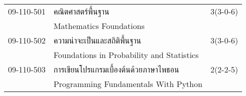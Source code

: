 \begin{longtable}{p{}p{}r{}}
09-110-501 & คณิตศาสตร์พื้นฐาน & 3(3-0-6)\\
 & Mathematics Foundations & \\[3mm]
09-110-502 & ความน่าจะเป็นและสถิติพื้นฐาน & 3(3-0-6)\\
 & Foundations in Probability and Statistics & \\[3mm]
09-110-503 & การเขียนโปรแกรมเบื้องต้นด้วยภาษาไพธอน & 2(2-2-5)\\
 & Programming Fundamentals With Python & \\[3mm]
\end{longtable}
